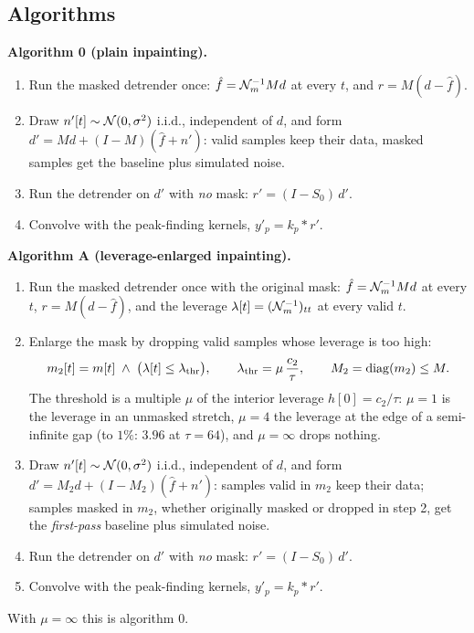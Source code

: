\documentclass{article}
\numberwithin{equation}{section}   %
\begin{document}
\subsection{Algorithms}
\label{sec:ip_algorithms}

{\bf Algorithm 0 (plain inpainting).}
\begin{enumerate}
\item Run the masked detrender once: $\hat f = {\cal N}_m^{-1}Md$ at every $t$, and $r = M(d - \hat f)$.
\item Draw $n'[t] \sim {\cal N}(0,\sigma^2)$ i.i.d., independent of $d$, and form
      $d' = Md + (I - M)(\hat f + n')$: valid samples keep their data, masked samples get the baseline plus
      simulated noise.
\item Run the detrender on $d'$ with {\em no} mask: $r' = (I - S_0)\,d'$.
\item Convolve with the peak-finding kernels, $y'_p = k_p * r'$.
\end{enumerate}

{\bf Algorithm A (leverage-enlarged inpainting).}
\begin{enumerate}
\item Run the masked detrender once with the original mask: $\hat f = {\cal N}_m^{-1}Md$ at every $t$,
      $r = M(d - \hat f)$, and the leverage $\lambda[t] = ({\cal N}_m^{-1})_{tt}$ at every valid $t$.
\item Enlarge the mask by dropping valid samples whose leverage is too high:
\begin{equation}
m_2[t] = m[t] \;\wedge\; \big(\lambda[t] \le \lambda_{\rm thr}\big), \qquad
\lambda_{\rm thr} = \mu\, \frac{c_2}{\tau}, \qquad M_2 = {\rm diag}(m_2) \le M .
\label{eq:ip_enlarge}
\end{equation}
      The threshold is a multiple $\mu$ of the interior leverage $h[0] = c_2/\tau$: $\mu = 1$ is the
      leverage in an unmasked stretch, $\mu = 4$ the leverage at the edge of a semi-infinite gap (to
      $1\%$: $3.96$ at $\tau = 64$), and $\mu = \infty$ drops nothing.
\item Draw $n'[t] \sim {\cal N}(0,\sigma^2)$ i.i.d., independent of $d$, and form
      $d' = M_2 d + (I - M_2)(\hat f + n')$: samples valid in $m_2$ keep their data; samples masked in
      $m_2$, whether originally masked or dropped in step 2, get the {\em first-pass} baseline plus
      simulated noise.
\item Run the detrender on $d'$ with {\em no} mask: $r' = (I - S_0)\,d'$.
\item Convolve with the peak-finding kernels, $y'_p = k_p * r'$.
\end{enumerate}
With $\mu = \infty$ this is algorithm 0.
\end{document}
